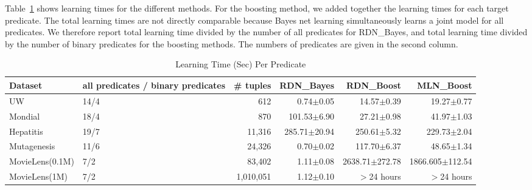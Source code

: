 \documentclass[runningheads,a4paper]{llncs}
\begin{document}
Table~\ref{table:learning-times} shows learning times for the different methods. For the boosting method, we added together the learning times for each target predicate. The total learning times are not directly comparable because Bayes net learning simultaneously learns a joint model for all predicates. We therefore report total learning time divided by the number of all predicates for RDN\_Bayes, and total learning time divided by the number of binary predicates for the boosting methods. The numbers of predicates are given in the second column.
\begin{table}[htbp]
  \centering
  \caption{Learning Time (Sec) Per Predicate}
    \begin{tabular}{|l|p{2cm}|r|r|r|r|}
\hline
     Dataset & all predicates / binary predicates & \# tuples & RDN\_Bayes & RDN\_Boost & MLN\_Boost \\ \hline
    UW    & 14/4  & 612   & 0.74$\pm$0.05 & 14.57$\pm$0.39 & 19.27$\pm$0.77  \\
    Mondial & 18/4  & 870   & 101.53$\pm$6.90 & 27.21$\pm$0.98 & 41.97$\pm$1.03 \\
    Hepatitis & 19/7  & 11,316 & 285.71$\pm$20.94 & 250.61$\pm$5.32 & 229.73$\pm$2.04  \\
    Mutagenesis & 11/6  & 24,326 & 0.70$\pm$0.02 & 117.70$\pm$6.37 & 48.65$\pm$1.34 \\ 
    MovieLens(0.1M) & 7/2   & 83,402 & 1.11$\pm$0.08 & 2638.71$\pm$272.78 &  1866.605$\pm$112.54\\
    MovieLens(1M) & 7/2   & 1,010,051 & 1.12$\pm$0.10 & $>$24 hours & $>$24 hours \\ \hline
  
    \end{tabular}%
  \label{table:learning-times}%
\end{table}%
%
%
%  
\end{document}
